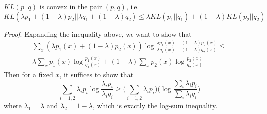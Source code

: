 \begin{theorem}
   $KL(p||q)$ is convex in the pair $(p,q)$, i.e.
   \begin{equation}
        KL(\lambda p_1 + (1-\lambda)p_2 || \lambda q_1 + (1-\lambda) q_2) \leq \lambda KL(p_1||q_1) + (1-\lambda) KL(p_2||q_2)
   \end{equation}
\end{theorem}
\textit{Proof}. Expanding the inequality above, we want to show that
\begin{eqnarray}
\sum_x(\lambda p_1(x) + (1-\lambda)p_2(x))\log\frac{\lambda p_1(x) + (1-\lambda)p_2(x)}{\lambda q_1(x) + (1-\lambda)q_2(x)} \leq \\
\lambda \sum_x p_1(x)\log\frac{p_1(x)}{q_1(x)} + (1-\lambda)\sum_x p_2(x)\log\frac{p_2(x)}{q_2(x)}
\end{eqnarray}
Then for a fixed $x$, it suffices to show that
\begin{equation}
    \sum_{i=1,2} \lambda_i p_i \log \frac{\lambda_i p_i}{\lambda_i q_i} \geq \bigg(\sum_{i=1,2}\lambda_i p_i \bigg)\bigg(\log \frac{\sum_i \lambda_i p_i}{\sum_i \lambda_i q_i} \bigg)
\end{equation}
where $\lambda_1 = \lambda$ and $\lambda_2 = 1-\lambda$, which is exactly the log-sum inequality.\\


